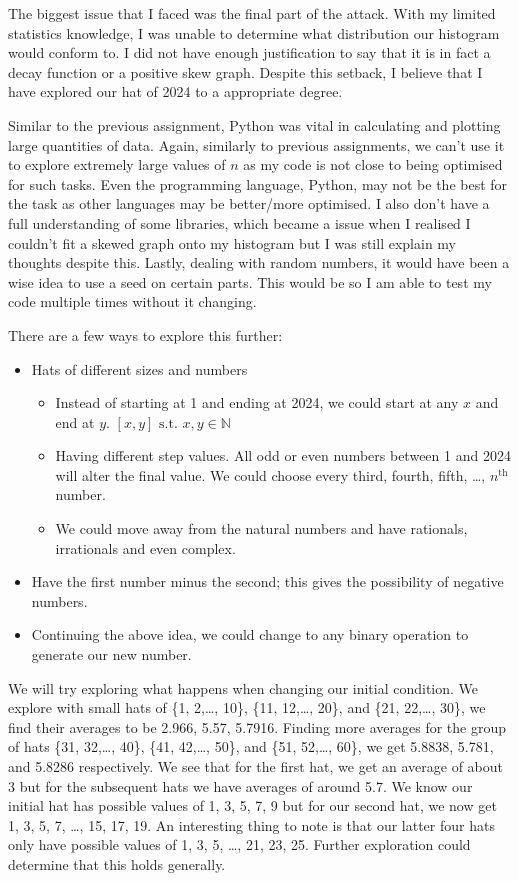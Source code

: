 \documentclass[11pt]{article}
\newcommand{\keywordfont}{\textsc}
\newcommand{\keyword}[1]{%
  \marginpar{\raggedright\small\keywordfont{#1}}}
\begin{document}
The biggest issue that I faced was the final part of the attack. With my limited statistics knowledge, I was unable to determine what distribution our histogram would conform to. I did not have enough justification to say that it is in fact a decay function or a positive skew graph. Despite this setback, I believe that I have explored our hat of 2024 to a appropriate degree. 

Similar to the previous assignment, Python \keyword{Reflect} was vital in calculating and plotting large quantities of data. Again, similarly to previous assignments, we can't use it to explore extremely large values of $n$ as my code is not close to being optimised for such tasks. Even the programming language, Python, may not be the best for the task as other languages may be better/more optimised. I also don't have a full understanding of some libraries, which became a issue when I realised I couldn't fit a skewed graph onto my histogram but I was still explain my thoughts despite this. Lastly, dealing with random numbers, it would have been a wise idea to use a seed on certain parts. This would be so I am able to test my code multiple times without it changing.

There are a few ways to \keyword{Extend} explore this further:
\begin{itemize}
    \item Hats of different sizes and numbers
    \begin{itemize}
        \item Instead of starting at 1 and ending at 2024, we could start at any $x$ and end at $y$. $[x, y] \text{ s.t. } x, y \in \mathbb{N}$ 
        \item Having different step values. All odd or even numbers between 1 and 2024 will alter the final value. We could choose every third, fourth, fifth, \dots, $n^{\text{th}}$ number.
        \item We could move away from the natural numbers and have rationals, irrationals and even complex.
    \end{itemize}
    \item Have the first number minus the second; this gives the possibility of negative numbers.
    \item Continuing the above idea, we could change to any binary operation to generate our new number.
\end{itemize}

We will try exploring what happens when changing our  \keyword{Extend} initial condition. We explore with small hats of \keyword{Specialise} \{1, 2,\dots, 10\}, \{11, 12,\dots, 20\}, and  \{21, 22,\dots, 30\}, we find their averages to be 2.966, 5.57, 5.7916. Finding more averages for the group of hats \{31, 32,\dots, 40\}, \{41, 42,\dots, 50\}, and  \{51, 52,\dots, 60\}, we get 5.8838, 5.781, and 5.8286 respectively. We see that for the first hat, we get an average of about 3 but for the subsequent hats we have averages of around 5.7. We know our initial hat has possible values of {1, 3, 5, 7, 9} but for our second hat, we now get  {1, 3, 5, 7, \dots, 15, 17, 19}. An interesting thing to note is that our latter  four hats only have possible values of {1, 3, 5, \dots, 21, 23, 25}.  Further exploration could determine that this holds generally. 
\end{document}
